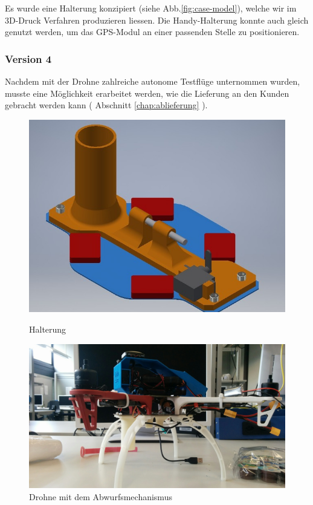 Es wurde eine Halterung konzipiert (siehe Abb.\ref{fig:case-model}), welche wir im 3D-Druck Verfahren produzieren liessen.
Die Handy-Halterung konnte auch gleich genutzt werden, um das GPS-Modul an einer passenden Stelle zu positionieren.

\subsubsection{Version 4}
Nachdem mit der Drohne zahlreiche autonome Testflüge unternommen wurden, musste eine Möglichkeit erarbeitet werden, wie die Lieferung an den Kunden gebracht werden kann ( Abschnitt \ref{chap:ablieferung} ).

\begin{figure}[H]
	\centering
	\begin{minipage}[b]{0.4\textwidth}
		\includegraphics[width=\textwidth]{images/hardware/parachute-model.jpg}
		\caption{Halterung}
		\label{fig:parachute-mode}
	\end{minipage}
	\hfill
	\begin{minipage}[b]{0.4\textwidth}
		\includegraphics[width=\textwidth]{images/hardware/drone-with-servo.jpg}
		\caption{Drohne mit dem Abwurfsmechanismus}
		\label{fig:drone-with-servo}
	\end{minipage}
\end{figure}


